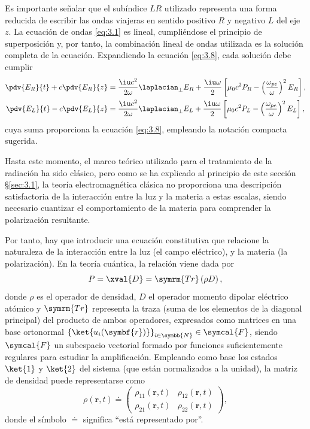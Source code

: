 Es importante señalar que el subíndice $LR$ utilizado representa una forma reducida de escribir las ondas viajeras en sentido positivo $R$ y negativo $L$ del eje $z$. La ecuación de ondas \eqref{eq:3.1} es lineal, cumpliéndose el principio de superposición y, por tanto, la combinación lineal de ondas utilizada es la solución completa de la ecuación. Expandiendo la ecuación \eqref{eq:3.8}, cada solución debe cumplir
\begin{align}
  \pdv{E_{R}}{t} + c \pdv{E_{R}}{z} &= \frac{\iu c^{2}}{2 \omega}\laplacian_{\perp}E_{R} + \frac{\iu \omega}{2} \left[\mu_{0}c^{2}P_{R} - \left(\frac{\omega_{pe}}{\omega}\right)^{2}E_{R}\right], \\
  \pdv{E_{L}}{t} - c \pdv{E_{L}}{z} &= \frac{\iu c^{2}}{2 \omega}\laplacian_{\perp}E_{L} + \frac{\iu \omega}{2} \left[\mu_{0}c^{2}P_{L} - \left(\frac{\omega_{pe}}{\omega}\right)^{2}E_{L}\right],
\end{align}
cuya suma proporciona la ecuación \eqref{eq:3.8}, empleando la notación compacta sugerida.

Hasta este momento, el marco teórico utilizado para el tratamiento de la radiación ha sido clásico, pero como se ha explicado al principio de este sección \S\ref{sec:3.1}, la teoría electromagnética clásica no proporciona una descripción satisfactoria \autocite{Griffiths2017} de la interacción entre la luz y la materia a estas escalas, siendo necesario cuantizar el comportamiento de la materia para comprender la polarización resultante.

Por tanto, hay que introducir una ecuación constitutiva que relacione la naturaleza de la interacción entre la luz (el campo eléctrico), y la materia (la polarización). En la teoría cuántica, la relación \autocite{Cohen-Tannoudji2019} viene dada por
\begin{equation}\label{eq:3.9}
  P = \xval{D} = \symrm{Tr} \left(\rho D \right),
\end{equation}
donde $\rho$ es el operador de densidad, $D$ el operador momento dipolar eléctrico atómico y $\symrm{Tr}$ representa la traza (suma de los elementos de la diagonal principal) del producto de ambos operadores, expresados como matrices en una base ortonormal $\left\{\ket{u_{i}(\symbf{r})}\right\}_{i \in \symbb{N}} \in \symcal{F}$, siendo $\symcal{F}$ un subespacio vectorial \autocite{Cohen-Tannoudji2019} formado por funciones suficientemente regulares para estudiar la amplificación. Empleando como base los estados $\ket{1}$ y $\ket{2}$ del sistema (que están normalizados a la unidad), la matriz de densidad puede representarse como
\begin{equation}\label{eq:3.10}
  \rho(\symbf{r},t) \doteq  
  \begin{pmatrix}
    \rho_{11}(\symbf{r},t) & \rho_{12}(\symbf{r},t) \\
    \rho_{21}(\symbf{r},t) & \rho_{22}(\symbf{r},t)
  \end{pmatrix},
\end{equation}
donde el símbolo $\doteq $ significa \enquote{está representado por}.

